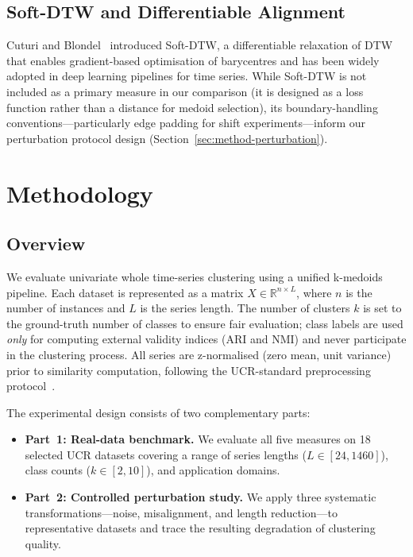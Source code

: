 \subsection{Soft-DTW and Differentiable Alignment}\label{sec:rw-softdtw}

Cuturi and Blondel~\cite{cuturi2017softdtw} introduced Soft-DTW, a differentiable relaxation of DTW that enables gradient-based optimisation of barycentres and has been widely adopted in deep learning pipelines for time series.
While Soft-DTW is not included as a primary measure in our comparison (it is designed as a loss function rather than a distance for medoid selection), its boundary-handling conventions---particularly edge padding for shift experiments---inform our perturbation protocol design (Section~\ref{sec:method-perturbation}).

\section{Methodology}\label{sec:methodology}

\subsection{Overview}\label{sec:method-overview}

We evaluate univariate whole time-series clustering using a unified k-medoids pipeline.
Each dataset is represented as a matrix $X \in \mathbb{R}^{n \times L}$, where $n$ is the number of instances and $L$ is the series length.
The number of clusters $k$ is set to the ground-truth number of classes to ensure fair evaluation; class labels are used \emph{only} for computing external validity indices (ARI and NMI) and never participate in the clustering process.
All series are z-normalised (zero mean, unit variance) prior to similarity computation, following the UCR-standard preprocessing protocol~\cite{paparrizos2020normalisation}.

The experimental design consists of two complementary parts:
\begin{itemize}
    \item \textbf{Part~1: Real-data benchmark.} We evaluate all five measures on 18 selected UCR datasets covering a range of series lengths ($L \in [24, 1460]$), class counts ($k \in [2, 10]$), and application domains.
    \item \textbf{Part~2: Controlled perturbation study.} We apply three systematic transformations---noise, misalignment, and length reduction---to representative datasets and trace the resulting degradation of clustering quality.
\end{itemize}

